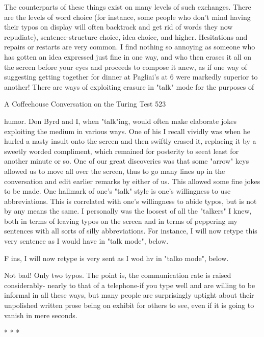     The counterparts of these things exist on many levels of such exchanges. There are
the levels of word choice (for instance, some people who don't mind having their
typos on display will often backtrack and get rid of words they now repudiate),
sentence-structure choice, idea choice, and higher. Hesitations and repairs or restarts
are very common. I find nothing so annoying as someone who has gotten an idea
expressed just fine in one way, and who then erases it all on the screen before your
eyes and proceeds to compose it anew, as if one way of suggesting getting together
for dinner at Pagliai's at 6 were markedly superior to another!
    There are ways of exploiting erasure in "talk" mode for the purposes of




A Coffeehouse Conversation on the Turing Test                                        523

humor. Don Byrd and I, when "talk"ing, would often make elaborate jokes exploiting
the medium in various ways. One of his I recall vividly was when he hurled a nasty
insult onto the screen and then swiftly erased it, replacing it by a sweetly worded
compliment, which remained for posterity to seeat least for another minute or so. One
of our great discoveries was that some "arrow" keys allowed us to move all over the
screen, thus to go many lines up in the conversation and edit earlier remarks by either
of us. This allowed some fine jokes to be made.
   One hallmark of one's "talk" style is one's willingness to use abbreviations. This is
correlated with one's willingness to abide typos, but is not by any means the same. I
personally was the loosest of all the "talkers" I knew, both in terms of leaving typos
on the screen and in terms of peppering my sentences with all sorts of silly
abbreviations. For instance, I will now retype this very sentence as I would have in
"talk mode", below.

   F ins, I will now retype is very sent as I wod hv in "talko mode", below.

Not bad! Only two typos. The point is, the communication rate is raised considerably-
nearly to that of a telephone-if you type well and are willing to be informal in all these
ways, but many people are surprisingly uptight about their unpolished written prose
being on exhibit for others to see, even if it is going to vanish in mere seconds.

                                        *   *   *

